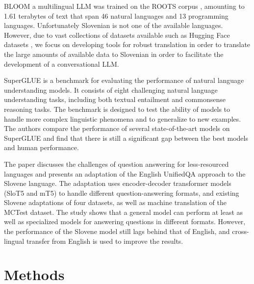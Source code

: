 \documentclass[fleqn,moreauthors,10pt]{ds_report}
\begin{document}
BLOOM \cite{scao2022bloom} a multilingual LLM  was trained on the ROOTS corpus \cite{roots}, amounting to 1.61 terabytes of text that span 46 natural languages and 13 programming languages. Unfortunately Slovenian is not one of the available languages. However, due to vast collections of datasets available such as  Hugging Face datasets \cite{lhoest2021datasets}, we focus on developing tools for robust translation in order to translate the large amounts of available data to Slovenian in order to facilitate the development of a conversational LLM.


SuperGLUE \cite{wang2019superglue} is a benchmark for evaluating the performance of natural language understanding models. It consists of eight challenging natural language understanding tasks, including both textual entailment and commonsense reasoning tasks. The benchmark is designed to test the ability of models to handle more complex linguistic phenomena and to generalize to new examples. The authors compare the performance of several state-of-the-art models on SuperGLUE and find that there is still a significant gap between the best models and human performance.

The paper \cite{logar2022unified} discusses the challenges of question answering for less-resourced languages and presents an adaptation of the English UnifiedQA approach to the Slovene language. The adaptation uses encoder-decoder transformer models (SloT5 and mT5) to handle different question-answering formats, and existing Slovene adaptations of four datasets, as well as machine translation of the MCTest dataset. The study shows that a general model can perform at least as well as specialized models for answering questions in different formats. However, the performance of the Slovene model still lags behind that of English, and cross-lingual transfer from English is used to improve the results.

\section*{Methods}


\end{document}
